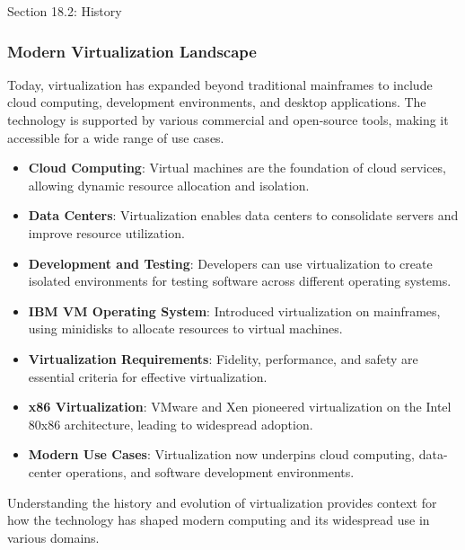 \begin{notes}{Section 18.2: History}
\begin{highlight}
    \end{highlight}
    
    \subsubsection*{Modern Virtualization Landscape}
    
    Today, virtualization has expanded beyond traditional mainframes to include cloud computing, development environments, and desktop applications. The technology is supported by various commercial and open-source tools, making it accessible for a wide range of use cases.
    
    \begin{highlight}
    
        \begin{itemize}
            \item \textbf{Cloud Computing}: Virtual machines are the foundation of cloud services, allowing dynamic resource allocation and isolation.
            \item \textbf{Data Centers}: Virtualization enables data centers to consolidate servers and improve resource utilization.
            \item \textbf{Development and Testing}: Developers can use virtualization to create isolated environments for testing software across different operating systems.
        \end{itemize}
    
    \end{highlight}
    
    \begin{highlight}
    
        \begin{itemize}
            \item \textbf{IBM VM Operating System}: Introduced virtualization on mainframes, using minidisks to allocate resources to virtual machines.
            \item \textbf{Virtualization Requirements}: Fidelity, performance, and safety are essential criteria for effective virtualization.
            \item \textbf{x86 Virtualization}: VMware and Xen pioneered virtualization on the Intel 80x86 architecture, leading to widespread adoption.
            \item \textbf{Modern Use Cases}: Virtualization now underpins cloud computing, data-center operations, and software development environments.
        \end{itemize}
    
    Understanding the history and evolution of virtualization provides context for how the technology has shaped modern computing and its widespread use in various domains.
    
    \end{highlight}
\end{notes}

